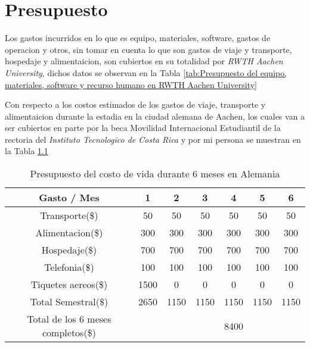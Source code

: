

\chapter{Presupuesto}
\label{ch:Presupuesto}

Los gastos incurridos en lo que es equipo, materiales, software, gastos de operacion y otros, sin
tomar en cuenta lo que son gastos de viaje y transporte, hospedaje y alimentaicion, son cubiertos
en su totalidad por \textit{RWTH Aachen University}, dichos datos se observan en la Tabla
\ref{tab:Presupuesto del equipo, materiales, software y recurso humano en RWTH Aachen University}

Con respecto a los costos estimados de los gastos de viaje, transporte y alimentaicion durante la
estadia en la ciudad alemana de Aachen, los cuales van a ser cubiertos en parte por la beca Movilidad
Internacional Estudiantil de la rectoria del \textit{Instituto Tecnologico de Costa Rica} y por mi persona
se muestran en la Tabla \ref{tab:Presupuesto del costo de vida durante 6 meses en Alemania}

\begin{table}[ht]

  \caption{Presupuesto del costo de vida durante 6 meses en Alemania}
  \centering
  \begin{tabular}{| c | c | c | c | c | c | c |}
   \hline\hline
   Gasto / Mes 		& 1   & 2 & 3 & 4 & 5 & 6 			\\ \hline\hline
   Transporte(\$) 	& 50  & 50 & 50 & 50 & 50 & 50 			\\ \hline
   Alimentacion(\$) 	& 300 & 300 & 300 & 300 & 300 & 300 		\\ \hline
   Hospedaje(\$) 	& 700 & 700 & 700 & 700 & 700 & 700 		\\ \hline
   Telefonia(\$) 	& 100 & 100 & 100 & 100 & 100 & 100 		\\ \hline
   Tiquetes aereos(\$) & 1500 & 0 & 0 & 0 & 0 & 0 			\\ \hline
   Total Semestral(\$) & 2650 & 1150 & 1150 & 1150 & 1150 & 1150	\\ \hline
   Total de los 6 meses completos(\$) & \multicolumn{1}{r}{}  & \multicolumn{1}{r}{} & \multicolumn{1}{r}{} & \multicolumn{1}{r}{8400} & \multicolumn{1}{r}{} & \multicolumn{1}{r|}{} 	\\ \hline\hline

   
  \end{tabular}
  \label{tab:Presupuesto del costo de vida durante 6 meses en Alemania}
 
  
\end{table}


